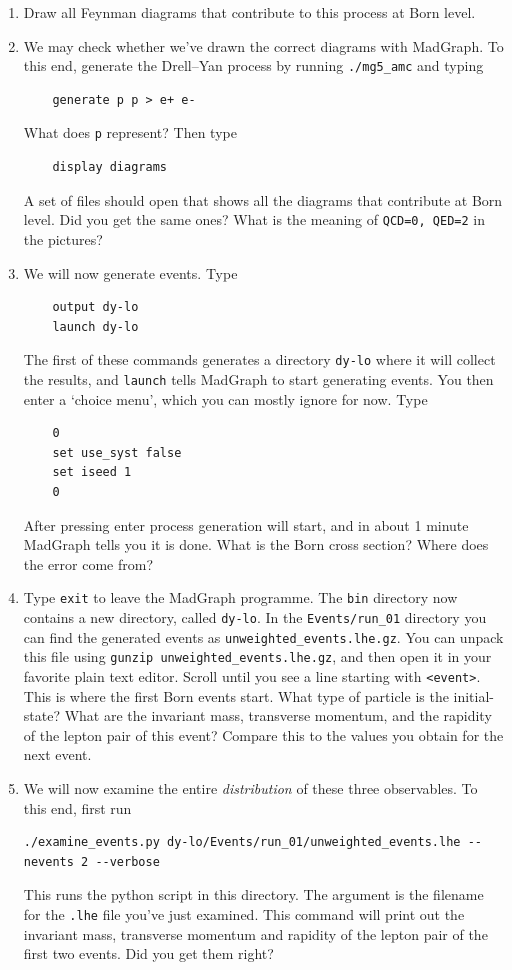 \documentclass{article}
\begin{document}
\begin{enumerate}
\item Draw all Feynman diagrams that contribute to this process at Born level. 
\item We may check whether we've drawn the correct diagrams with MadGraph. To this end, generate the Drell--Yan process by running \texttt{./mg5\_amc}  and typing
\begin{verbatim}
	generate p p > e+ e-
\end{verbatim}
What does \texttt{p} represent?
Then type
\begin{verbatim}
	display diagrams
\end{verbatim}
A set of files should open that shows all the diagrams that contribute at Born level. Did you get the same ones? What is the meaning of \texttt{QCD=0, QED=2} in the pictures?
\item We will now generate events. Type
\begin{verbatim}
	output dy-lo
	launch dy-lo
\end{verbatim}
The first of these commands generates a directory \texttt{dy-lo} where it will collect the results, and \texttt{launch} tells MadGraph to start generating events. 
%
You then enter a `choice menu', which you can mostly ignore for now. Type
\begin{verbatim}
	0
	set use_syst false
	set iseed 1
	0
\end{verbatim}
%
After pressing enter process generation will start, and in about 1 minute MadGraph tells you it is done. 
%
What is the Born cross section? Where does the error come from?
\item Type \texttt{exit} to leave the MadGraph programme. The \texttt{bin} directory now contains a new directory, called \texttt{dy-lo}. In the \texttt{Events/run\_01} directory you can find the generated events as \texttt{unweighted\_events.lhe.gz}.
%
You can unpack this file using \texttt{gunzip unweighted\_events.lhe.gz}, and then open it in your favorite plain text editor. 
%
Scroll until you see a line starting with \texttt{<event>}. 
%
This is where the first Born events start. What type of particle is the initial-state? What are the invariant mass, transverse momentum, and the rapidity of the lepton pair of this event? Compare this to the values you obtain for the next event. 

\item We will now examine the entire \emph{distribution} of these three observables. To this end, first run 
\begin{verbatim}
./examine_events.py dy-lo/Events/run_01/unweighted_events.lhe --nevents 2 --verbose
\end{verbatim}
This runs the python script in this directory. The argument is the filename for the \texttt{.lhe} file you've just examined. This command will print out the invariant mass, transverse momentum and rapidity of the lepton pair of the first two events. Did you get them right? 


\end{enumerate}
\end{document}
